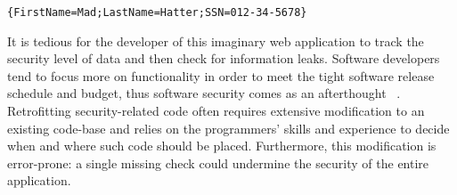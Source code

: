 \begin{lstlisting}[numbers=none,xleftmargin=0.15\textwidth]
{FirstName=Mad;LastName=Hatter;SSN=012-34-5678}
\end{lstlisting}

\noindent It is tedious for the developer of this imaginary web application to
track the security level of data and then check for information leaks. Software
developers tend to focus more on functionality in order to meet the tight
software release schedule and budget, thus software security comes as an
afterthought
~\parencite{assal2018security,sharma2017aspects,steward2012software}.
Retrofitting security-related code often requires extensive modification to an
existing code-base and relies on the programmers' skills and experience to
decide when and where such code should be placed. Furthermore, this modification
is error-prone: a single missing check could undermine the security of the
entire application.

\begin{figure*}[tbp]
  \small
  \center
{}
\caption{The parse tree generated from the example user input.
  All terminals are represented as labeled values:
  the {\color{red} red} ones, such as the digits of SSN,
  are of high-security, while the {\color{green} green} ones, such as the keys
  of the record and first name / last name, are of low-security.}
\label{fig:parsetree}
\end{figure*}

